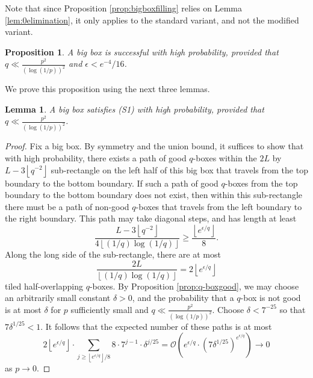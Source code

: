 \documentclass{article}
\newcommand{\floor}[1]{\left\lfloor#1\right \rfloor}
\newcommand{\cO}{\mathcal O}
\numberwithin{equation}{section}
\newtheorem{lemma}[theorem]{Lemma}
\newtheorem{prop}[theorem]{Proposition}
\begin{document}
Note that since Proposition \ref{prop:bigboxfilling} relies on Lemma \ref{lem:0elimination}, it only applies to the standard  variant, and not the modified variant.

\begin{prop}\label{prop:bigboxsuccessful}
    A big box is successful with high probability, provided that $q \ll \frac{p^2}{(\log(1/p))^2}$ and $\epsilon < e^{-4}/16$.
\end{prop}
We prove this proposition using the next three lemmas.
\begin{lemma}\label{lem:S1}
    A big box satisfies (S1) with high probability, provided that $q \ll \frac{p^2}{(\log(1/p))^2}$.
\end{lemma}
\begin{proof}
    Fix a big box.
    By symmetry and the union bound, it suffices to show that with high probability, there exists a path of good $q$-boxes within the $2L$ by $L - 3\floor{q^{-2}}$ sub-rectangle on the left half of this big box that travels from the top boundary to the bottom boundary.
    If such a path of good $q$-boxes from the top boundary to the bottom boundary does not exist, then within this sub-rectangle there must be a path of non-good $q$-boxes that travels from the left boundary to the right boundary.
    This path may take diagonal steps, and has length at least
    \[
    \frac{L - 3\floor{q^{-2}}}{4 \floor{(1/q)\log(1/q)}} \geq \frac{\floor{e^{\epsilon/q}}}{8}.
    \]
    Along the long side of the sub-rectangle, there are at most 
    \[
    \frac{2L}{\floor{(1/q)\log(1/q)}} = 2\floor{e^{\epsilon/q}}
    \]
    tiled half-overlapping $q$-boxes.
    By Proposition \ref{prop:q-boxgood}, we may choose an arbitrarily small constant $\delta > 0$, and the probability that a $q$-box is not good is at most $\delta$ for $p$ sufficiently small and $q \ll \frac{p^2}{(\log(1/p))^2}$.
    Choose $\delta < 7^{-25}$ so that $7\delta^{1/25} < 1$.
    It follows that the expected number of these paths is at most
    \[
    2\floor{e^{\epsilon/q}} \cdot \sum_{j \geq \floor{e^{\epsilon/q}}/8}8 \cdot 7^{j-1}\cdot \delta^{j/25} = \cO(e^{\epsilon/q}\cdot (7\delta^{1/25})^{e^{\epsilon/q}}) \to 0
    \]
    as $p \to 0$.
\end{proof}
\end{document}
